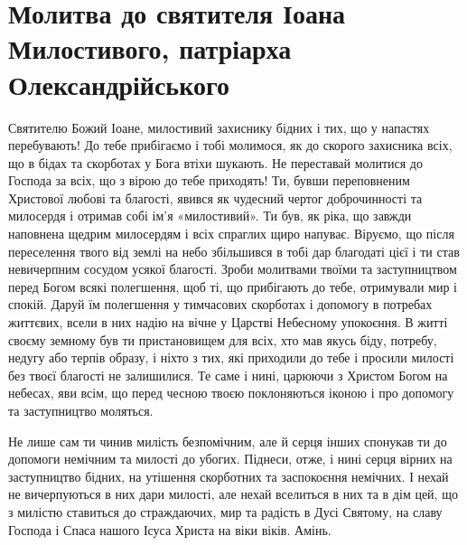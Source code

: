 \documentclass[chapters.tex]{subfiles}
\begin{document}
\section{Молитва до святителя Іоана Милостивого, патріарха Олександрійського}
Святителю Божий Іоане, милостивий захиснику бідних і тих, що у напастях перебувають! До тебе прибігаємо і тобі молимося, як до скорого захисника всіх, що в бідах та скорботах у Бога втіхи шукають. Не переставай молитися до Господа за всіх, що з вірою до тебе приходять! Ти, бувши переповненим Христової любові та благості, явився як чудесний чертог доброчинності та милосердя і отримав собі ім’я «милостивий». Ти був, як ріка, що завжди наповнена щедрим милосердям і всіх спраглих щиро напуває. Віруємо, що після переселення твого від землі на небо збільшився в тобі дар благодаті цієї і ти став невичерпним сосудом усякої благості. Зроби молитвами твоїми та заступництвом перед Богом всякі полегшення, щоб ті, що прибігають до тебе, отримували мир і спокій. Даруй їм полегшення у тимчасових скорботах і допомогу в потребах життєвих, всели в них надію на вічне у Царстві Небесному упокоєння. В житті своєму земному був ти пристановищем для всіх, хто мав якусь біду, потребу, недугу або терпів образу, і ніхто з тих, які приходили до тебе і просили милості без твоєї благості не залишилися. Те саме і нині, царюючи з Христом Богом на небесах, яви всім, що перед чесною твоєю поклоняються іконою і про допомогу та заступництво моляться.

Не лише сам ти чинив милість безпомічним, але й серця інших спонукав ти до допомоги немічним та милості до убогих. Піднеси, отже, і нині серця вірних на заступництво бідних, на утішення скорботних та заспокоєння немічних. І нехай не вичерпуються в них дари милості, але нехай вселиться в них та в дім цей, що з милістю ставиться до страждаючих, мир та радість в Дусі Святому, на славу Господа і Спаса нашого Ісуса Христа на віки віків. Амінь.
\end{document}
